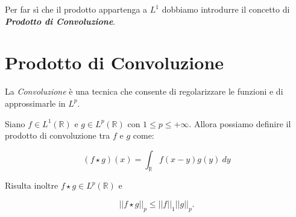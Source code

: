 Per far sì che il prodotto appartenga a $L^1$ dobbiamo introdurre il concetto di
\textit{\textbf{Prodotto di Convoluzione}}.

\section{Prodotto di Convoluzione}

La \textit{Convoluzione} è una tecnica che consente di regolarizzare le funzioni
e di approssimarle in $L^p$.
\begin{definition}
    Siano $f \in L^1(\mathbb{R})$ e $g \in L^p(\mathbb{R})$ con $1 \leq p \leq +\infty$.
    Allora possiamo definire il prodotto di convoluzione tra $f$ e $g$ come:

    $$
        \left( f \star g\right)(x) = \int_{\mathbb{R}} f(x - y) g(y) \ dy
    $$

    Risulta inoltre $f \star g \in L^p(\mathbb{R})$ e

    $$
        ||f \star g||_p \leq ||f||_1 ||g||_p.
    $$
\end{definition}